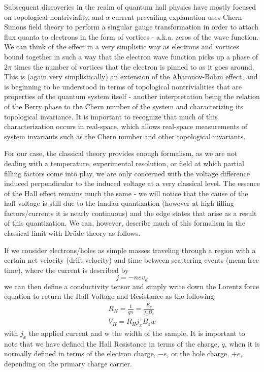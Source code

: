 \documentclass[reprint, nobibnotes, amssymb, amsmath, amsfonts, physics, mathtools, mathrsfs, floatfix]{revtex4-1}
\begin{document}
    Subsequent discoveries in the realm of quantum hall physics have mostly focused on topological nontriviality, and a current prevailing explanation uses Chern-Simons field theory to perform a singular gauge transformation in order to attach flux quanta to electrons in the form of vortices - a.k.a. zeros of the wave function.  We can think of the effect in a very simplistic way as electrons and vortices bound together in such a way that the electron wave function picks up a phase of $2\pi$ times the number of vortices that the electron is pinned to as it goes around.  This is (again very simplistically) an extension of the Aharonov-Bohm effect, and is beginning to be understood in terms of topological nontrivialities that are properties of the quantum system itself - another interpretation being the relation of the Berry phase to the Chern number of the system and characterizing its topological invariance.  It is important to recognize that much of this characterization occurs in real-space, which allows real-space measurements of system invariants such as the Chern number and other topological invariants.

    For our case, the classical theory provides enough formalism, as we are not dealing with a temperature, experimental resolution, or field at which partial filling factors come into play, we are only concerned with the voltage difference induced perpendicular to the induced voltage at a very classical level.  The essence of the Hall effect remains much the same - we will notice that the cause of the hall voltage is still due to the landau quantization (however at high filling factors/currents it is nearly continuous) and the edge states that arise as a result of this quantization.  We can, however, describe much of this formalism in the classical limit with Dr\"{u}de theory as follows.

    If we consider electrons/holes as simple masses traveling through a region with a certain net velocity (drift velocity) and time between scattering events (mean free time), where the current is described by
    \begin{equation}
      j = -nev_d
    \end{equation}
    we can then define a conductivity tensor and simply write down the Lorentz force equation to return the Hall Voltage and Resistance as the following:
    \begin{gather}
      R_H = \frac{1}{q n} = \frac{E_y}{j_x B_z} \label{hall_resist} \\
      V_H = R_H j_x B_z w \label{hall_volt}
    \end{gather}
    with $j_x$ the applied current and w the width of the sample.  It is important to note that we have defined the Hall Resistance in terms of the charge, $q$, when it is normally defined in terms of the electron charge, $-e$, or the hole charge, $+e$, depending on the primary charge carrier.
\end{document}
